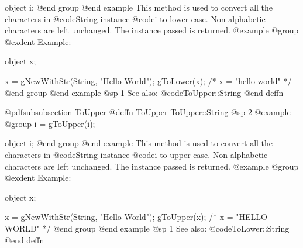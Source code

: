 object  i;
@end group
@end example
This method is used to convert all the characters in @code{String}
instance @code{i} to lower case.  Non-alphabetic characters are left
unchanged.  The instance passed is returned.
@example
@group
@exdent Example:

object  x;

x = gNewWithStr(String, "Hello World");
gToLower(x);
/*  x = "hello world"  */
@end group
@end example
@sp 1
See also:  @code{ToUpper::String}
@end deffn












@pdfsubsubsection {ToUpper}
@deffn {ToUpper} ToUpper::String
@sp 2
@example
@group
i = gToUpper(i);

object  i;
@end group
@end example
This method is used to convert all the characters in @code{String}
instance @code{i} to upper case.  Non-alphabetic characters are left
unchanged.  The instance passed is returned.
@example
@group
@exdent Example:

object  x;

x = gNewWithStr(String, "Hello World");
gToUpper(x);
/*  x = "HELLO WORLD"  */
@end group
@end example
@sp 1
See also:  @code{ToLower::String}
@end deffn




